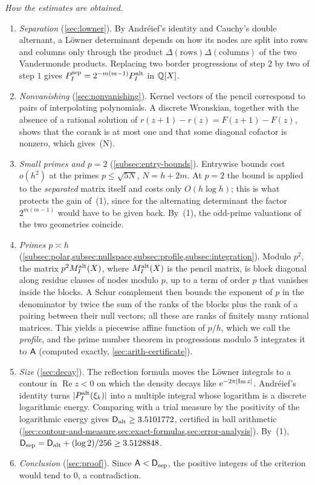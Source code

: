 \emph{How the estimates are obtained.}
\begin{enumerate}[(1)]
  \item \emph{Separation} (\cref{sec:lowner}). By Andr\'eief's identity and Cauchy's double
  alternant, a L\"owner determinant depends on how its nodes are split into rows and columns only
  through the product $\Delta(\text{rows})\Delta(\text{columns})$ of the two Vandermonde products.
  Replacing two border progressions of step $2$ by two of step $1$ gives
  $P^{\mathrm{sep}}_I=2^{-m(m-1)}P^{\mathrm{alt}}_I$ in $\mathbb{Q}[X]$.
  \item \emph{Nonvanishing} (\cref{sec:nonvanishing}). Kernel vectors of the pencil correspond to
  pairs of interpolating polynomials. A discrete Wronskian, together with the absence of a
  rational solution of $r(z+1)-r(z)=F(z+1)-F(z)$, shows that the corank is at most one and that
  some diagonal cofactor is nonzero, which gives~(N).
  \item \emph{Small primes and $p=2$} (\cref{subsec:entry-bounds}). Entrywise bounds cost
  $o(h^2)$ at the primes $p\le\sqrt{5N}$, $N=h+2m$. At $p=2$ the bound is applied to the
  \emph{separated} matrix itself and costs only $O(h\log h)$; this is what protects the gain
  of~(1), since for the alternating determinant the factor $2^{m(m-1)}$ would have to be given
  back. By~(1), the odd-prime valuations of the two geometries coincide.
  \item \emph{Primes $p\asymp h$} (\cref{subsec:polar,subsec:nullspace,subsec:profile,subsec:integration}).
  Modulo $p^2$, the matrix $p^2M^{\mathrm{alt}}_I(X)$, where $M^{\mathrm{alt}}_I(X)$ is the pencil matrix, is
  block diagonal along residue classes of nodes modulo $p$, up to a term of order $p$ that
  vanishes inside the blocks. A Schur complement then bounds the exponent of $p$ in the
  denominator by twice the sum of the ranks of the blocks plus the rank of a pairing between
  their null vectors; all these are ranks of finitely many rational matrices. This yields a piecewise
  affine function of $p/h$, which we call the \emph{profile}, and the prime number theorem in
  progressions modulo $5$ integrates it to $\mathsf{A}$ (computed exactly, \cref{sec:arith-certificate}).
  \item \emph{Size} (\cref{sec:decay}). The reflection formula moves the L\"owner integrals to a
  contour in $\operatorname{Re}z<0$ on which the density decays like $\mathrm{e}^{-2\pi\lvert \operatorname{Im}z\rvert}$.
  Andr\'eief's identity turns $\lvert P^{\mathrm{alt}}_I(\xi_k)\rvert$ into a multiple integral whose logarithm
  is a discrete logarithmic energy. Comparing with a trial measure by the positivity of the
  logarithmic energy gives $\mathsf{D}_{\mathrm{alt}}\ge3.5101772$, certified in ball arithmetic
  (\cref{sec:contour-and-measure,sec:exact-formulas,sec:error-analysis}). By~(1),
  $\mathsf{D}_{\mathrm{sep}}=\mathsf{D}_{\mathrm{alt}}+(\log2)/256\ge3.5128848$.
  \item \emph{Conclusion} (\cref{sec:proof}). Since $\mathsf{A}<\mathsf{D}_{\mathrm{sep}}$, the positive integers of the
  criterion would tend to $0$, a contradiction.
\end{enumerate}

